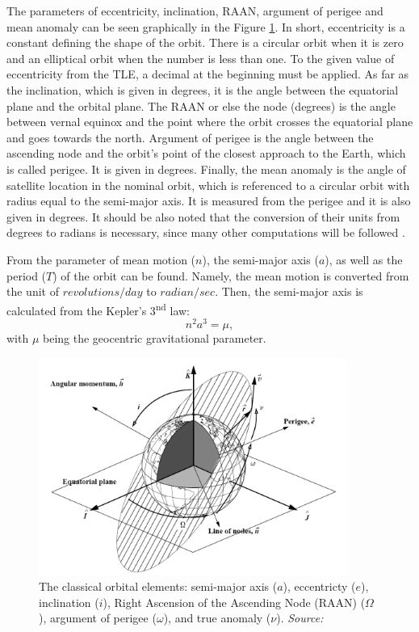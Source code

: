 The parameters of eccentricity, inclination, RAAN, argument of perigee and mean anomaly can be seen graphically in the Figure \ref{keplerian_elements}. In short, eccentricity is a constant defining the shape of the orbit. There is a circular orbit when it is zero and an elliptical orbit when the number is less than one. To the given value of eccentricity from the TLE, a decimal at the beginning must be applied. As far as the inclination, which is given in degrees, it is the angle between the equatorial plane and the orbital plane. The RAAN or else the node (degrees) is the angle between vernal equinox and the point where the orbit crosses the equatorial plane and goes towards the north. Argument of perigee is the angle between the ascending node and the orbit's point of the closest approach to the Earth, which is called perigee. It is given in degrees. Finally, the mean anomaly is the angle of satellite location in the nominal orbit, which is referenced to a circular orbit with radius equal to the semi-major axis. It is measured from the perigee and it is also given in degrees. It should be also noted that the conversion of their units from degrees to radians is necessary, since many other computations will be followed \cite{Vallado}.

From the parameter of mean motion ($n$), the semi-major axis ($a$), as well as the period ($T$) of the orbit can be found. Namely, the mean motion is converted from the unit of $revolutions/day$ to $radian/sec$. Then, the semi-major axis is calculated from the Kepler's 3\textsuperscript{nd} law:
\begin{equation}
\label{3rd_keplers_law}
n^2 a^3 = \mu,
\end{equation}
with $\mu$ being the geocentric gravitational parameter.

\begin{figure}
\centering
\includegraphics[width=0.9\textwidth]{Images/keplerian_elements.png}\caption{The classical orbital elements: semi-major axis ($a$), eccentricty ($e$), inclination ($i$), Right Ascension of the Ascending Node (RAAN) ($\Omega$), argument of perigee ($\omega$), and true anomaly ($\nu$). \textit{Source: \cite{Vallado}}}
\label{keplerian_elements} 
\end{figure}

